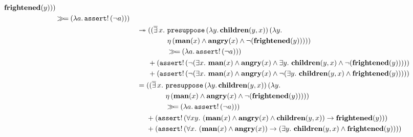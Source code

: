 \begin{align*}
\begin{aligned}[t]
\begin{aligned}[t]
{                  \textbf{frightened}(y)))} \\
           &\mathbin{\gg\!=} (\lambda a.\, \mathtt{assert}!\,(\lnot a)))
         \end{aligned}
    \end{aligned} \\
  &\twoheadrightarrow \begin{aligned}[t]
     &((\mathop{\overline{\exists}} x.\ \begin{aligned}[t]
         &\mathtt{presuppose}\,(\lambda y.\, \textbf{children}(y, x))\,(\lambda y.\,  \\
         &\eta\,(\textbf{man}(x) \land \textbf{angry}(x) \land \lnot (\textbf{frightened}(y))))) \\
         &\mathbin{\gg\!=} (\lambda a.\, \mathtt{assert}!\,(\lnot a))) \\
       \end{aligned} \\
     &+ (\mathtt{assert}!\,(\lnot (\exists x.\ \textbf{man}(x) \land \textbf{angry}(x) \land
                   \exists y.\ \textbf{children}(y, x) \land
                   \lnot (\textbf{frightened}(y))))) \\
     &+ (\mathtt{assert}!\,(\lnot (\exists x.\ \textbf{man}(x) \land \textbf{angry}(x) \land
                   \lnot (\exists y.\ \textbf{children}(y, x) \land
                   \textbf{frightened}(y))))) \\
   \end{aligned} \\
  &= \begin{aligned}[t]
     &((\mathop{\overline{\exists}} x.\ \begin{aligned}[t]
         &\mathtt{presuppose}\,(\lambda y.\, \textbf{children}(y, x))\,(\lambda y.\,  \\
         &\eta\,(\textbf{man}(x) \land \textbf{angry}(x) \land \lnot (\textbf{frightened}(y))))) \\
         &\mathbin{\gg\!=} (\lambda a.\, \mathtt{assert}!\,(\lnot a))) \\
       \end{aligned} \\
     &+ (\mathtt{assert}!\,(\forall x y.\ (\textbf{man}(x) \land \textbf{angry}(x) \land
                          \textbf{children}(y, x)) \to \textbf{frightened}(y))) \\
     &+ (\mathtt{assert}!\,(\forall x.\ (\textbf{man}(x) \land \textbf{angry}(x)) \to (\exists y.\ \textbf{children}(y, x) \land \textbf{frightened}(y))))
   \end{aligned}
\end{align*}

